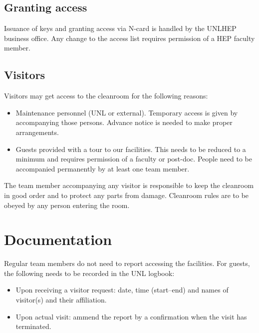 \documentclass[12pt]{unlsilabsop}
\begin{document}
\subsection{Granting access}
Issuance of keys and granting access via N-card is handled by the UNLHEP business office. Any change to the access list requires permission of a HEP faculty member.


\subsection{Visitors}
Visitors may get access to the cleanroom for the following reasons:
\begin{itemize}
    \item Maintenance personnel (UNL or external). Temporary access is given by accompanying those persons. Advance notice is needed to make proper arrangements.
    \item Guests provided with a tour to our facilities. This needs to be reduced to a minimum and requires permission of a faculty or post-doc. People need to be accompanied permanently by at least one team member.
\end{itemize}
The team member accompanying any visitor is responsible to keep the cleanroom in good order and to protect any parts from damage. Cleanroom rules are to be obeyed by any person entering the room.


\section{Documentation}
Regular team members do not need to report accessing the facilities. For guests, the following needs to be recorded in the UNL logbook:
\begin{itemize}
    \item Upon receiving a visitor request: date, time (start--end) and names of visitor(s) and their affiliation.
    \item Upon actual visit: ammend the report by a confirmation when the visit has terminated.
\end{itemize}
\end{document}
